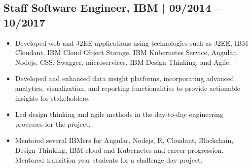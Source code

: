 \documentclass[12pt,]{scrartcl}
\begin{document}
\subsection*{Staff Software Engineer, IBM | 09/2014 -- 10/2017}
\begin{itemize}
\item Developed web and J2EE applications using technologies such as J2EE, IBM Cloudant, IBM Cloud Object Storage, IBM Kubernetes Service, Angular, Nodejs, CSS, Swagger, microservices, IBM Design Thinking, and Agile.
 \item Developed and enhanced data insight platforms, incorporating advanced analytics, visualization, and reporting functionalities to provide actionable insights for stakeholders.
 \item Led design thinking and agile methods in the day-to-day engineering processes for the project. 
\item Mentored several IBMers for Angular, Nodejs, R, Cloudant, Blockchain, Design Thinking, IBM cloud and Kubernetes and career progression. Mentored transition year students for a challenge day project. 
    
\end{itemize}
\end{document}
